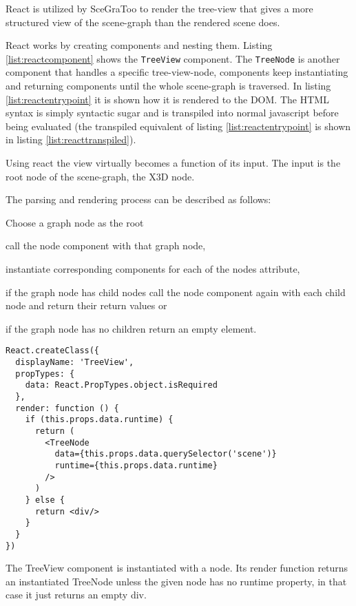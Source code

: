 React is utilized by \gls{SceGraToo} to render the tree-view that gives a more
structured view of the scene-graph than the rendered scene does.

React works by creating components and nesting them. Listing
\ref{list:reactcomponent} shows the \texttt{TreeView} component. The
\texttt{TreeNode} is another component that handles a specific tree-view-node,
components keep instantiating and returning components until the whole
scene-graph is traversed. In listing \ref{list:reactentrypoint} it is shown how
it is rendered to the \gls{DOM}. The \gls{HTML} syntax is simply syntactic sugar and is
transpiled into normal javascript before being evaluated (the transpiled
equivalent of listing \ref{list:reactentrypoint} is shown in listing
\ref{list:reacttranspiled}).

Using react the view virtually becomes a function of its input. The input is the root node of the scene-graph, the \gls{X3D} node.

The parsing and rendering process can be described as follows:
\begin{enumerate*}
  \item Choose a graph node as the root
  \item call the node component with that graph node,
  \item instantiate corresponding components for each of the nodes attribute,
  \item if the graph node has child nodes call the node component again with each child node and return their return values or
  \item if the graph node has no children return an empty element.
\end{enumerate*}

\begin{listing}
  \begin{verbatim}
React.createClass({
  displayName: 'TreeView',
  propTypes: {
    data: React.PropTypes.object.isRequired
  },
  render: function () {
    if (this.props.data.runtime) {
      return (
        <TreeNode
          data={this.props.data.querySelector('scene')}
          runtime={this.props.data.runtime}
        />
      )
    } else {
      return <div/>
    }
  }
})
  \end{verbatim}
  \caption{The TreeView component is instantiated with a node. Its render function returns an instantiated TreeNode unless the given node has no runtime property, in that case it just returns an empty div.}
  \label{list:reactcomponent}
\end{listing}


